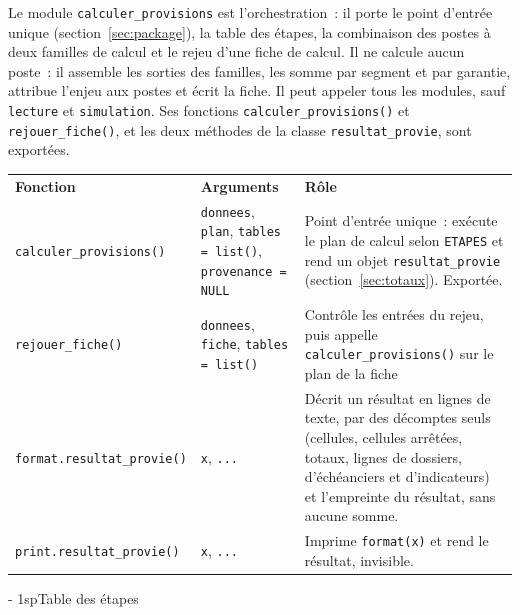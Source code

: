 \documentclass[a4paper,11pt]{article}
\makeatletter
\newcommand{\fsp}{\unskip\nobreak\hskip .5\fontdimen2\font\relax}
\newcommand{\titrebandeau}[1]{%
  \noindent{\color{financeblue}\rule{\linewidth}{2.5pt}}
  \par\vspace{5mm}
  {\color{greenline}\raggedright\fontsize{19}{23}\bfseries\selectfont #1\par}
  \vspace{6mm}}
\newcommand{\charte@bandeau}[1]{%
  \parindent\z@ \everypar{\strut}%
  {\strut\par}\nobreak
  \titrebandeau{#1}\nobreak
  \kern\z@\nobreak\strut\par}
\newcommand{\charte@reserve}[1]{\par\ifinner\else\if@nobreak\else
  \penalty\z@ %
  \begingroup\setlength{\dimen@}{#1}%
  \dimen@ii\pagegoal \advance\dimen@ii-\pagetotal
  \ifdim\pagegoal=\maxdimen\else\ifdim\dimen@>\dimen@ii
    \vfil\penalty-\@M %
  \fi\fi\endgroup\fi\fi}
\renewcommand{\section}{\charte@reserve{12\baselineskip}%
  \@startsection{section}{1}{\z@}%
  {\z@}{1sp}{\normalfont\charte@bandeau}}
\newcommand{\code}[1]{\texttt{\small #1}}
\makeatother
\begin{document}
Le module \code{calculer\_provisions} est l'orchestration~: il porte le
point d'entrée unique (section~\ref{sec:package}), la table des étapes, la
combinaison des postes à deux familles de calcul et le rejeu d'une fiche de
calcul. Il ne calcule aucun poste~: il assemble les sorties des familles,
les somme par segment et par garantie, attribue l'enjeu aux postes et écrit
la fiche. Il peut appeler tous les modules, sauf \code{lecture} et
\code{simulation}. Ses fonctions \code{calculer\_provisions()} et
\code{rejouer\_fiche()}, et les deux méthodes de la classe
\code{resultat\_provie}, sont exportées.

\begin{center}
\small
{}
\begin{tabular}{@{}p{5.6cm}>{\raggedright\arraybackslash}p{3.0cm}p{6.5cm}@{}}
\rowcolor{tableheader}
\textcolor{financeblue}{\textbf{Fonction}} & \textcolor{financeblue}{\textbf{Arguments}} & \textcolor{financeblue}{\textbf{Rôle}} \\
\code{calculer\_provisions()} & \code{donnees}, \code{plan}, \code{tables = list()}, \code{provenance = NULL} & Point d'entrée unique~: exécute le plan de calcul selon \code{ETAPES} et rend un objet \code{resultat\_provie} (section~\ref{sec:totaux}). Exportée. \\
\code{rejouer\_fiche()} & \code{donnees}, \code{fiche}, \code{tables = list()} & Contrôle les entrées du rejeu, puis appelle \code{calculer\_provisions()} sur le plan de la fiche\fsp; rend le résultat et les signalements de version. Exportée. \\
\code{format.resultat\_provie()} & \code{x}, \code{...} & Décrit un résultat en lignes de texte, par des décomptes seuls (cellules, cellules arrêtées, totaux, lignes de dossiers, d'échéanciers et d'indicateurs) et l'empreinte du résultat, sans aucune somme. \\
\code{print.resultat\_provie()} & \code{x}, \code{...} & Imprime \code{format(x)} et rend le résultat, invisible. \\
\end{tabular}
\end{center}

\section{Table des étapes}
\label{sec:etapes}
\end{document}
